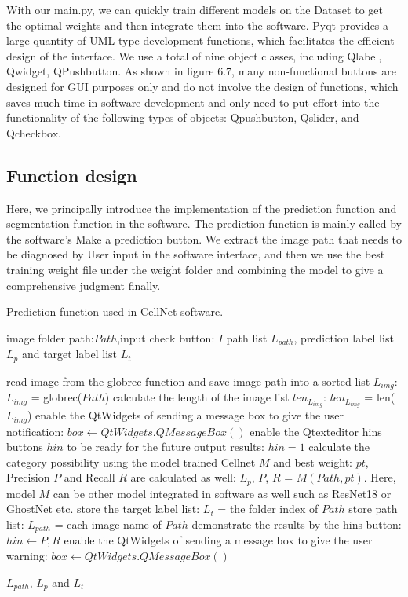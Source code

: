 With our main.py, we can quickly train different models on the Dataset to get the optimal weights and then integrate them into the software. Pyqt provides a large quantity of UML-type development functions, which facilitates the efficient design of the interface. We use a total of nine object classes, including Qlabel, Qwidget, QPushbutton. As shown in figure 6.7, many non-functional buttons are designed for GUI purposes only and do not involve the design of functions, which saves much time in software development and only need to put effort into the functionality of the following types of objects: Qpushbutton, Qslider, and Qcheckbox.


\subsection{Function design} %
\label{sub:amet}
Here, we principally introduce the implementation of the prediction function and segmentation function in the software. The prediction function is mainly called by the software's Make a prediction button. We extract the image path that needs to be diagnosed by User input in the software interface, and then we use the best training weight file under the weight folder and combining the model to give a comprehensive judgment finally.


\begin{algorithm}[b]
  \caption{Prediction function used in CellNet software.}
  \label{alg:Framwork}
  \begin{algorithmic}[1]
    \Require
    image folder path:$Path$,input check button: $I$
    \Ensure
     path list $L_{path}$, prediction label list $L_{p}$ and target label list $L_{t}$
  
      \State  read image from the globrec function and save image path into a sorted list $L_{img}$: $L_{img}$ = globrec($Path$)
      \State  calculate the length of the image list $len_{L_{img}}$: $len_{L_{img}}$ = len($L_{img}$)
      \State  enable the QtWidgets of sending a message box to give the user notification: $box  \gets QtWidgets.QMessageBox()$
      \State  enable the Qtexteditor  hins buttons $hin$ to be ready for the future output results: $ hin = 1$
      \State  calculate the category possibility using the model trained Cellnet $M$ and best weight: $pt$, Precision $P$ and Recall $R$ are calculated as well: $L_{p}$, $P$, $R$ = $M(Path,pt)$. Here, model $M$ can be other model integrated in software as well such as ResNet18 or GhostNet etc.
      \State  store the target label list: $L_{t}$ = the folder index of $Path$
      \State  store path list: $L_{path}$ = each image name of $Path$
      \State  demonstrate the results by the hins button: $hin  \gets P, R$
    \Else
      \State  enable the QtWidgets of sending a message box to give the user warning: $box  \gets QtWidgets.QMessageBox()$
      
    \EndIf \newline
   \Return  $L_{path}$, $L_{p}$ and $L_{t}$
  \end{algorithmic}
\end{algorithm}



